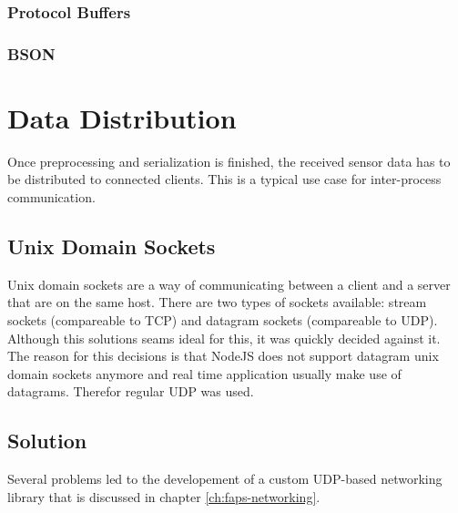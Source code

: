 \subsubsection{Protocol Buffers}

\subsubsection{BSON}

\section{Data Distribution}

Once preprocessing and serialization is finished, the received sensor data has to be distributed to connected clients. This is a typical use case for inter-process communication.

\subsection{Unix Domain Sockets}

Unix domain sockets are a way of communicating between a client and a server that are on the same host. There are two types of sockets available: stream sockets (compareable to TCP) and datagram sockets (compareable to
UDP). Although this solutions seams ideal for this, it was quickly decided against it. The reason for this decisions is that NodeJS does not support datagram unix domain sockets anymore and real time application usually
make use of datagrams. Therefor regular UDP was used.

\subsection{Solution}

Several problems led to the developement of a custom UDP-based networking library that is discussed in chapter \ref{ch:faps-networking}.
